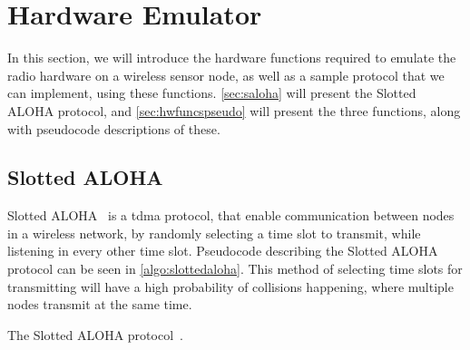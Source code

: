 \section{Hardware Emulator}\label{sec:mpiprotocol}
In this section, we will introduce the hardware functions required to emulate the radio hardware on a wireless sensor node, as well as a sample protocol that we can implement, using these functions. \autoref{sec:saloha} will present the Slotted ALOHA protocol, and \autoref{sec:hwfuncspseudo} will present the three functions, along with pseudocode descriptions of these.

\subsection{Slotted ALOHA}\label{sec:saloha}
Slotted ALOHA~\cite{Roberts:1975:APS:1024916.1024920} is a \gls{tdma} protocol, that enable communication between nodes in a wireless network, by randomly selecting a time slot to transmit, while listening in every other time slot. Pseudocode describing the Slotted ALOHA protocol can be seen in \autoref{algo:slottedaloha}. This method of selecting time slots for transmitting will have a high probability of collisions happening, where multiple nodes transmit at the same time.\medbreak

\begin{algorithm}[ht]
    \DontPrintSemicolon


    \caption{The Slotted ALOHA protocol~\cite{Roberts:1975:APS:1024916.1024920}.}
    \label{algo:slottedaloha}
\end{algorithm}

